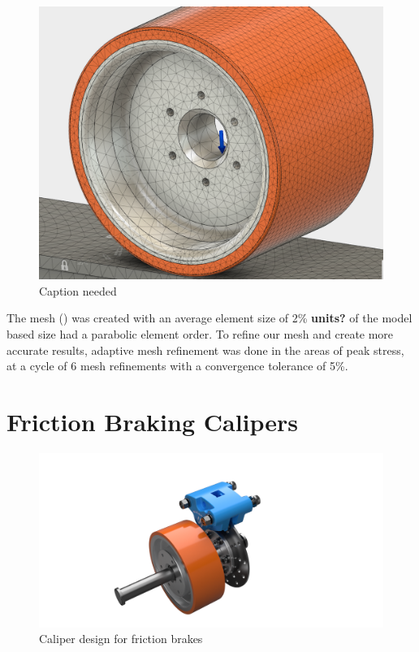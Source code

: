 \documentclass[main.tex]{subfiles}
\begin{document}
    \begin{figure}
        \centering
        \includegraphics[width=\linewidth]{images/fig22}
        \caption{Caption needed}
        \label{fig:mesh}
    \end{figure}
    The mesh () was created with an average element size of 2\% \textbf{units?} of the model based size had a parabolic element order. To refine our mesh and create more accurate results, adaptive mesh refinement was done in the areas of peak stress, at a cycle of 6 mesh refinements with a convergence tolerance of 5\%.

    \section{Friction Braking Calipers}
    \label{sec:friction-braking-calipers}
    \begin{figure}[H]
        \centering
        \includegraphics[width=\linewidth]{images/fig23}
        \caption{Caliper design for friction brakes}
    \end{figure}
\end{document}
